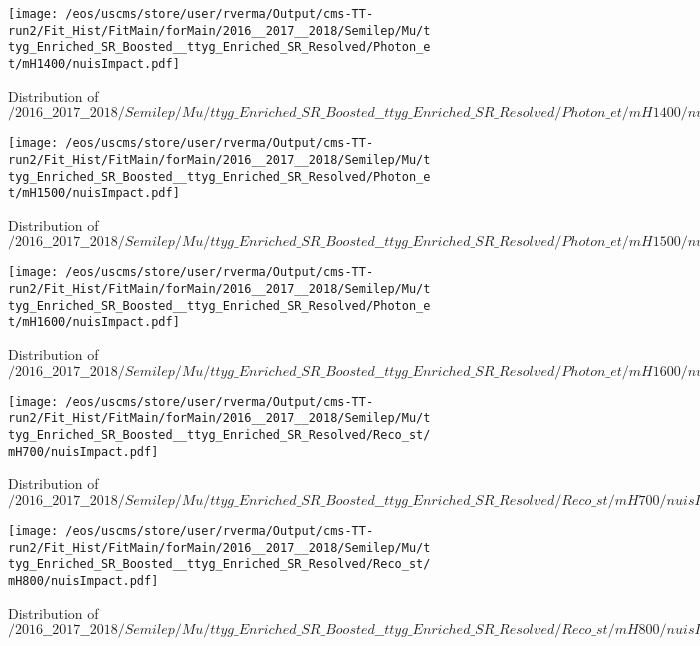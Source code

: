 \begin{figure}
\centering
\texttt{[image: /eos/uscms/store/user/rverma/Output/cms-TT-run2/Fit\_Hist/FitMain/forMain/2016\_\_2017\_\_2018/Semilep/Mu/ttyg\_Enriched\_SR\_Boosted\_\_ttyg\_Enriched\_SR\_Resolved/Photon\_et/mH1400/nuisImpact.pdf]}
\caption{Distribution of $/2016\_\_2017\_\_2018/Semilep/Mu/ttyg\_Enriched\_SR\_Boosted\_\_ttyg\_Enriched\_SR\_Resolved/Photon\_et/mH1400/nuisImpact.pdf$}
\end{figure}

\begin{figure}
\centering
\texttt{[image: /eos/uscms/store/user/rverma/Output/cms-TT-run2/Fit\_Hist/FitMain/forMain/2016\_\_2017\_\_2018/Semilep/Mu/ttyg\_Enriched\_SR\_Boosted\_\_ttyg\_Enriched\_SR\_Resolved/Photon\_et/mH1500/nuisImpact.pdf]}
\caption{Distribution of $/2016\_\_2017\_\_2018/Semilep/Mu/ttyg\_Enriched\_SR\_Boosted\_\_ttyg\_Enriched\_SR\_Resolved/Photon\_et/mH1500/nuisImpact.pdf$}
\end{figure}

\begin{figure}
\centering
\texttt{[image: /eos/uscms/store/user/rverma/Output/cms-TT-run2/Fit\_Hist/FitMain/forMain/2016\_\_2017\_\_2018/Semilep/Mu/ttyg\_Enriched\_SR\_Boosted\_\_ttyg\_Enriched\_SR\_Resolved/Photon\_et/mH1600/nuisImpact.pdf]}
\caption{Distribution of $/2016\_\_2017\_\_2018/Semilep/Mu/ttyg\_Enriched\_SR\_Boosted\_\_ttyg\_Enriched\_SR\_Resolved/Photon\_et/mH1600/nuisImpact.pdf$}
\end{figure}

\begin{figure}
\centering
\texttt{[image: /eos/uscms/store/user/rverma/Output/cms-TT-run2/Fit\_Hist/FitMain/forMain/2016\_\_2017\_\_2018/Semilep/Mu/ttyg\_Enriched\_SR\_Boosted\_\_ttyg\_Enriched\_SR\_Resolved/Reco\_st/mH700/nuisImpact.pdf]}
\caption{Distribution of $/2016\_\_2017\_\_2018/Semilep/Mu/ttyg\_Enriched\_SR\_Boosted\_\_ttyg\_Enriched\_SR\_Resolved/Reco\_st/mH700/nuisImpact.pdf$}
\end{figure}

\begin{figure}
\centering
\texttt{[image: /eos/uscms/store/user/rverma/Output/cms-TT-run2/Fit\_Hist/FitMain/forMain/2016\_\_2017\_\_2018/Semilep/Mu/ttyg\_Enriched\_SR\_Boosted\_\_ttyg\_Enriched\_SR\_Resolved/Reco\_st/mH800/nuisImpact.pdf]}
\caption{Distribution of $/2016\_\_2017\_\_2018/Semilep/Mu/ttyg\_Enriched\_SR\_Boosted\_\_ttyg\_Enriched\_SR\_Resolved/Reco\_st/mH800/nuisImpact.pdf$}
\end{figure}

